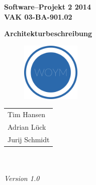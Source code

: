\documentclass[fontsize=12pt,paper=a4,twoside]{scrartcl}
\begin{document}
  \thispagestyle{fancy}
  \fancyhead[LO,RE]{ }
  \fancyfoot[C]{}

  \vspace{3cm}

  \begin{minipage}[H]{\textwidth}
  \begin{center}
  \bf
  \Large
  Software--Projekt 2 2014\\
  \smallskip
  \small
  VAK 03-BA-901.02\\
  \vspace{3cm}
  \end{center}
  \end{minipage}
  \begin{minipage}[H]{\textwidth}
  \begin{center}
  \vspace{1cm}
  \bf
  \Large Architekturbeschreibung\\
  \vspace{3ex}
   	  \begin{figure}[H]
      \centering
      \includegraphics[width=0.25\textwidth]{../WOYM.png}
      \end{figure}
  \vfill
  \end{center}
  \end{minipage}
  \vfill
  \begin{minipage}[H]{\textwidth}
  \begin{center}
  \sf
  \begin{tabular}{l}
  Tim Hansen \\
  Adrian Lück \\
  Jurij Schmidt\\
  \end{tabular}
  \\ ~
  \vspace{2cm}
  \\
  \it Version 1.0\\ ~
  \end{center}
  \end{minipage}
\end{document}
